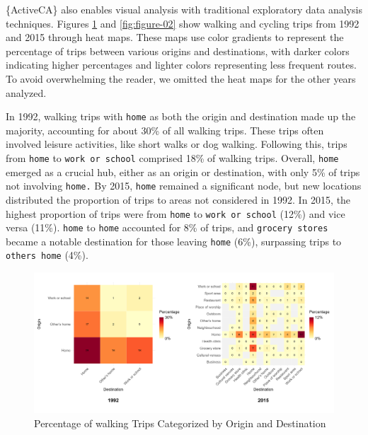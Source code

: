 \documentclass[Royal,times,sageh]{sagej}
\begin{document}
\{ActiveCA\} also enables visual analysis with traditional exploratory
data analysis techniques. Figures \ref{fig:figure-01} and
\ref{fig:figure-02} show walking and cycling trips from 1992 and 2015
through heat maps. These maps use color gradients to represent the
percentage of trips between various origins and destinations, with
darker colors indicating higher percentages and lighter colors
representing less frequent routes. To avoid overwhelming the reader, we
omitted the heat maps for the other years analyzed.

In 1992, walking trips with \texttt{home} as both the origin and
destination made up the majority, accounting for about 30\% of all
walking trips. These trips often involved leisure activities, like short
walks or dog walking. Following this, trips from \texttt{home} to
\texttt{work\ or\ school} comprised 18\% of walking trips. Overall,
\texttt{home} emerged as a crucial hub, either as an origin or
destination, with only 5\% of trips not involving \texttt{home.} By
2015, \texttt{home} remained a significant node, but new locations
distributed the proportion of trips to areas not considered in 1992. In
2015, the highest proportion of trips were from \texttt{home} to
\texttt{work\ or\ school} (12\%) and vice versa (11\%). \texttt{home} to
\texttt{home} accounted for 8\% of trips, and \texttt{grocery\ stores}
became a notable destination for those leaving \texttt{home} (6\%),
surpassing trips to \texttt{other\textquotesingle{}s\ home} (4\%).

\begin{figure}

{\centering \includegraphics[width=1\linewidth]{Manuscript-figures/walking_hm_fig} 

}

\caption{Percentage of walking Trips Categorized by Origin and Destination}\label{fig:figure-01}
\end{figure}
\end{document}
